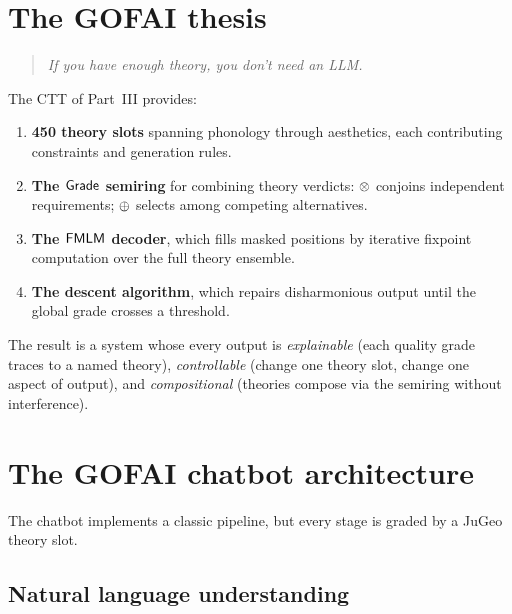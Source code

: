 \section{The GOFAI thesis}
\label{sec:gofai-thesis}

\begin{quote}
\emph{If you have enough theory, you don't need an LLM.}
\end{quote}

The CTT of Part~III provides:
\begin{enumerate}[label=(\arabic*)]
  \item \textbf{450 theory slots} spanning phonology through aesthetics,
        each contributing constraints and generation rules.
  \item \textbf{The $\mathsf{Grade}$ semiring} for combining theory verdicts:
        $\otimes$ conjoins independent requirements; $\oplus$ selects
        among competing alternatives.
  \item \textbf{The $\mathsf{FMLM}$ decoder}, which fills masked positions
        by iterative fixpoint computation over the full theory
        ensemble.
  \item \textbf{The descent algorithm}, which repairs
        disharmonious output until the global grade crosses a
        threshold.
\end{enumerate}

The result is a system whose every output is \emph{explainable}
(each quality grade traces to a named theory), \emph{controllable}
(change one theory slot, change one aspect of output), and
\emph{compositional} (theories compose via the semiring without
interference).

\section{The GOFAI chatbot architecture}
\label{sec:gofai-chatbot}

The chatbot implements a classic pipeline, but every stage is
graded by a JuGeo theory slot.

\subsection{Natural language understanding}
\label{ssec:nlu}

